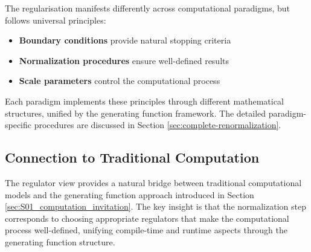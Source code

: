 The regularisation manifests differently across computational paradigms, but follows universal principles:
\begin{itemize}
\item \textbf{Boundary conditions} provide natural stopping criteria
\item \textbf{Normalization procedures} ensure well-defined results
\item \textbf{Scale parameters} control the computational process
\end{itemize}

Each paradigm implements these principles through different mathematical structures, unified by the generating function framework. The detailed paradigm-specific procedures are discussed in Section \ref{sec:complete-renormalization}.

\subsection{Connection to Traditional Computation}

The regulator view provides a natural bridge between traditional computational models and the generating function approach introduced in Section \ref{sec:S01_computation_invitation}. The key insight is that the normalization step corresponds to choosing appropriate regulators that make the computational process well-defined, unifying compile-time and runtime aspects through the generating function structure.
